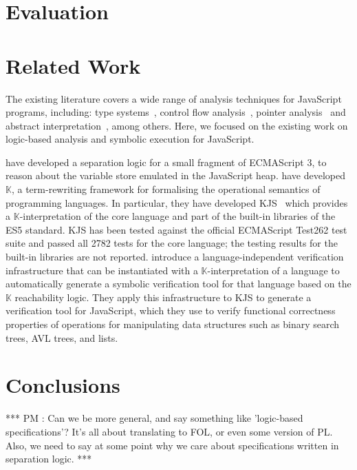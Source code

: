 \documentclass{llncs}
\newcommand{\myparagraph}[1]{\smallskip\noindent {\bf #1.}\hspace{1pt}}
\newcommand{\pmaxinline}[1]{ {\color{blue} *** PM : #1 ***} }
\begin{document}
\section{Evaluation}



\section{Related Work} 

The existing literature covers a wide range of analysis techniques for JavaScript programs, including: 
type systems~\cite{thiemann:esop:2005,anderson:ecoop:2005,jensen:sas:2009,typescript:toot:2014,feldthaus:oopsla:2014,bierman:ecoop:2014,rastogi:popl:2015},
control flow analysis~\cite{feldthaus2013efficient}, pointer analysis~\cite{jang2009points,sridharan:ecoop:12} and abstract
interpretation~\cite{kashyap:fse:14,jensen:sas:2009,andreasen:oopsla:2014,park:ecoop:15}, among others. 
Here, we focused on the existing work on logic-based analysis and symbolic execution for JavaScript. 

\myparagraph{Symbolic Execution} 




\myparagraph{Logic-based Analysis} 
%
\cite{gardner:popl:2012} have developed a separation logic for a small fragment of ECMAScript 3, to reason about the variable store emulated in the JavaScript heap.
%
\cite{rosu-serbanuta-2010-jlap} have developed $\mathbb{K}$, a term-rewriting framework  for  formalising the operational
semantics of programming languages.
 In particular, they have developed KJS~\cite{Park:2015} which provides a $\mathbb{K}$-interpretation of the core language and part of the built-in libraries of the ES5 standard. KJS has been tested against the official ECMAScript Test262 test suite and passed all 2782 tests for the core language; the testing results for the built-in libraries are not reported. 
\cite{stefanescu-park-yuwen-li-rosu-2016-oopsla} introduce a language-independent verification infrastructure 
that can be instantiated with a $\mathbb{K}$-interpretation of a  language to automatically generate a symbolic verification tool for that language based on the $\mathbb{K}$ reachability logic. They apply this infrastructure to KJS to generate a verification tool for JavaScript, which they use to verify functional correctness properties of operations for manipulating data structures such as binary search trees, AVL trees, and lists.


\section{Conclusions}\label{conclusions}

\pmaxinline{Can we be more general, and say something like 'logic-based specifications'? It's all about translating to FOL, or even some version of PL. Also, we need to say at some point why we care about specifications written in separation logic.}

\newpage



\newpage
\appendix




 
\end{document}
